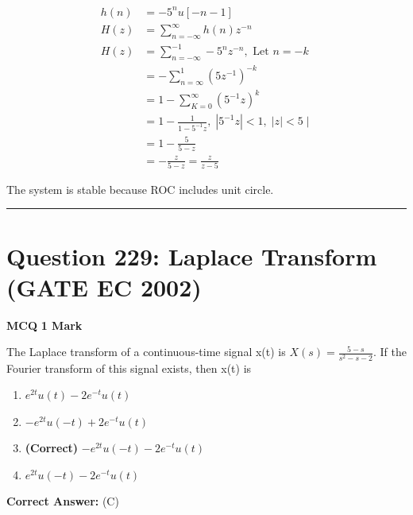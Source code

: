 \documentclass[11pt,a4paper]{article}
\begin{document}
\begin{tcolorbox}[solbox, title=Detailed Solution -- Question 228]
\[
\begin{aligned} h(n) &= -5^{n}u[- n-1] \\ H(z) &=\sum_{n=-\infty}^{\infty} h(n) z^{-n} \\ H(z) &=\sum_{n=-\infty}^{-1}-5^{n} z^{-n}, \text { Let } n=-k \\ &=-\sum_{n=\infty}^{1}\left(5 z^{-1}\right)^{-k} \\ &=1-\sum_{K=0}^{\infty}\left(5^{-1} z\right)^{k} \\ &=1-\frac{1}{1-5^{-1} z}, \; \left|5^{-1} z\right| < 1 , \; |z| < 5 \mid \\ &=1-\frac{5}{5-z} \\ &=-\frac{z}{5-z}=\frac{z}{z-5} \end{aligned}
\]

 The system is stable because ROC includes unit circle.
\end{tcolorbox}

\vspace{1.5em}
\hrule
\vspace{1.5em}

\section*{Question 229: Laplace Transform (GATE EC 2002)}
\noindent \textbf{\color{primary}MCQ} \hfill \textbf{\color{secondary}1 Mark}


\noindent The Laplace transform of a continuous-time signal x(t) is $X(s)=\frac{5-s}{s^{2}-s-2}$. If the Fourier transform of this signal exists, then x(t) is


\begin{enumerate}[label=(\Alph*)]
    \item $e^{2t}u(t)-2e^{-t}u(t)$
    \item $-e^{2t}u(-t)+2e^{-t}u(t)$
    \item \textbf{(Correct)} $-e^{2t}u(-t)-2e^{-t}u(t)$
    \item $e^{2t}u(-t)-2e^{-t}u(t)$
\end{enumerate}

\noindent \textbf{Correct Answer:} (C)
\end{document}

